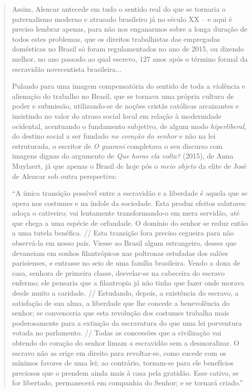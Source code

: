 \begin{quote}
Assim, Alencar antecede em tudo o sentido real do que se tornaria o
paternalismo moderno e atrasado brasileiro já no século XX -- e aqui é
preciso lembrar apenas, para não nos enganarmos sobre a longa duração de
todos estes problemas, que os direitos trabalhistas das empregadas
domésticas no Brasil só foram regulamentados no ano de 2015, ou dizendo
melhor, no ano passado ao qual escrevo, 127 anos após o término formal
da escravidão novecentista brasileira...

Pulando para uma imagem compensatória do sentido de toda a violência e
alienação do trabalho no Brasil, que se tornava uma própria cultura de
poder e submissão, utilizando-se de noções cristãs católicas arcaizantes
e insistindo no valor do atraso social local em relação à modernidade
ocidental, acentuando o fundamento subjetivo, de algum modo
\emph{hiperliberal}, do destino social a ser fundado \emph{no coração do
senhor} e não na lei estruturada, o escritor de \emph{O guarani}
completava o seu discurso com imagens dignas do argumento de \emph{Que
horas ela volta?} (2015), de Anna Muylaert, já que apenas o Brasil de
hoje pôs o \emph{meio objeto} da elite de José de Alencar sob outra
perspectiva:

``A única transição possível entre a escravidão e a liberdade é aquela
que se opera nos costumes e na índole da sociedade. Esta produz efeitos
salutares: adoça o cativeiro; vai lentamente transformando-o em mera
servidão, até que chega a uma espécie de orfandade. O domínio do senhor
se reduz então a uma tutela benéfica. // Esta transição fora preciso
cegueira para não observá-la em nosso país. Viesse ao Brasil algum
estrangeiro, desses que devaneiam em sonhos filantrópicos nas poltronas
estufadas dos salões parisienses, e entrasse no seio de uma família
brasileira. Vendo a dona de casa, senhora de primeira classe,
desvelar-se na cabeceira do escravo enfermo; ele pensaria que a
filantropia já não tinha que fazer onde morava desde muito a caridade.
// Estudando, depois, a existência do escravo, a satisfação de sua alma,
a liberdade que lhe concede a benevolência do senhor; se convenceria que
esta revolução dos costumes trabalha mais poderosamente para a extinção
da escravatura do que uma lei porventura votada no parlamento. // Todas
as concessões que a civilização vai obtendo do coração do senhor limam a
escravidão sem a desmoralizar. O escravo não as erige em direito para
revoltar-se, como sucede com os mínimos favores de uma lei; ao
contrário, tornam-se para ele benefícios preciosos que o prendem ainda
mais à casa pela gratidão. Esse cativo, se for libertado, permanecerá em
companhia do Senhor; e se tornará criado.''


\end{quote}
